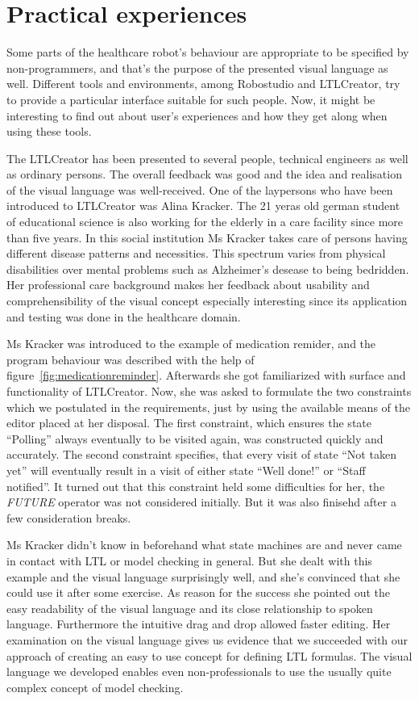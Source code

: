 \section{Practical experiences}
\label{sec:practicalexperiences}

Some parts of the healthcare robot's behaviour are appropriate to be specified by non-programmers, and that's the purpose of the presented visual language as well. Different tools and environments, among Robostudio and LTLCreator, try to provide a particular interface suitable for such people. Now, it might be interesting to find out about user's experiences and how they get along when using these tools.

The LTLCreator has been presented to several people, technical engineers as well as ordinary persons. The overall feedback was good and the idea and realisation of the visual language was well-received. One of the laypersons who have been introduced to LTLCreator was Alina Kracker. The 21 yeras old german student of educational science is also working for the elderly in a care facility since more than five years. In this social institution Ms Kracker takes care of persons having different disease patterns and necessities. This spectrum varies from physical disabilities over mental problems such as Alzheimer's desease to being bedridden.
Her professional care background makes her feedback about usability and comprehensibility of the visual concept especially interesting since its application and testing was done in the healthcare domain.

Ms Kracker was introduced to the example of medication remider, and the program behaviour was described with the help of figure~\ref{fig:medicationreminder}. Afterwards she got familiarized with surface and functionality of LTLCreator. Now, she was asked to formulate the two constraints which we postulated in the requirements, just by using the available means of the editor placed at her disposal.
The first constraint, which ensures the state ``Polling'' always eventually to be visited again, was constructed quickly and accurately.
The second constraint specifies, that every visit of state ``Not taken yet'' will eventually result in a visit of either state ``Well done!'' or ``Staff notified''. It turned out that this constraint held some difficulties for her, the \emph{FUTURE} operator was not considered initially. But it was also finisehd after a few consideration breaks.

Ms Kracker didn't know in beforehand what state machines are and never came in contact with LTL or model checking in general. But she dealt with this example and the visual language surprisingly well, and she's convinced that she could use it after some exercise. As reason for the success she pointed out the easy readability of the visual language and its close relationship to spoken language. Furthermore the intuitive drag and drop allowed faster editing.
Her examination on the visual language gives us evidence that we succeeded with our approach of creating an easy to use concept for defining LTL formulas. The visual language we developed enables even non-professionals to use the usually quite complex concept of model checking.

